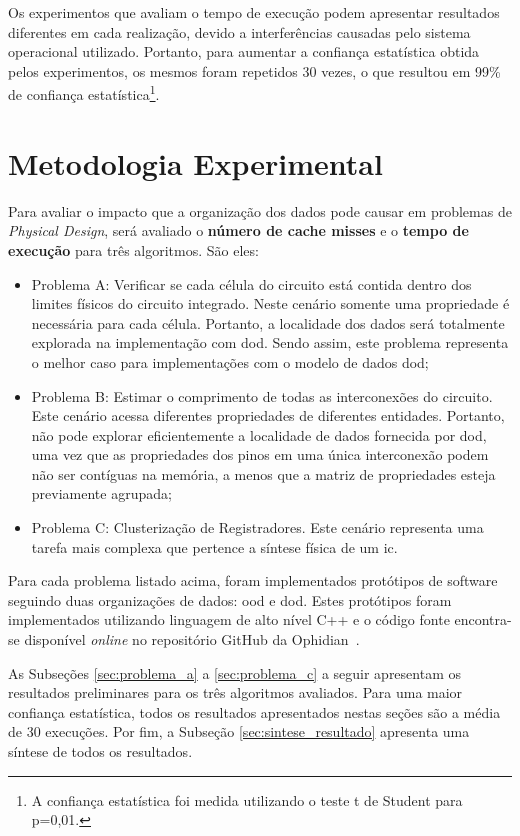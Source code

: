 Os experimentos que avaliam o tempo de execução podem apresentar resultados diferentes em cada realização, devido a interferências causadas pelo sistema operacional utilizado. Portanto, para aumentar a confiança estatística obtida pelos experimentos, os mesmos foram repetidos 30 vezes, o que resultou em 99\% de confiança estatística\footnote{A confiança estatística foi medida utilizando o teste t de Student para p=0,01.}.

\section{Metodologia Experimental}
\label{sec:metodologia_experimental}

Para avaliar o impacto que a organização dos dados pode causar em problemas de \textit{Physical Design}, será avaliado o \textbf{número de cache misses} e o \textbf{tempo de execução} para três algoritmos. São eles:
\begin{itemize}
    \item Problema A: Verificar se cada célula do circuito está contida dentro dos  limites físicos do circuito integrado. Neste cenário somente uma propriedade é necessária para cada célula. Portanto, a localidade dos dados será totalmente explorada na implementação com \ac{dod}. Sendo assim, este problema representa o melhor caso para implementações com o modelo de dados \ac{dod};
    \item Problema B: Estimar o comprimento de todas as interconexões do circuito. Este cenário acessa diferentes propriedades de diferentes entidades. Portanto, não pode explorar eficientemente a localidade de dados fornecida por \ac {dod}, uma vez que as propriedades dos pinos em uma única interconexão podem não ser contíguas na memória, a menos que a matriz de propriedades esteja previamente agrupada;
    \item Problema C: Clusterização de Registradores. Este cenário representa uma tarefa mais complexa que pertence a síntese física de um \ac{ic}.
\end{itemize}

Para cada problema listado acima, foram implementados protótipos de software seguindo duas organizações de dados: \ac{ood} e \ac{dod}.
Estes protótipos foram implementados utilizando linguagem de alto nível C++ e o código fonte encontra-se disponível \textit{online} no repositório GitHub da Ophidian~\cite{ophidian}.

As Subseções \ref{sec:problema_a} a \ref{sec:problema_c} a seguir apresentam os resultados preliminares para os três algoritmos avaliados.
Para uma maior confiança estatística, todos os resultados apresentados nestas seções são a média de 30 execuções.
Por fim, a Subseção \ref{sec:sintese_resultado} apresenta uma síntese de todos os resultados.


